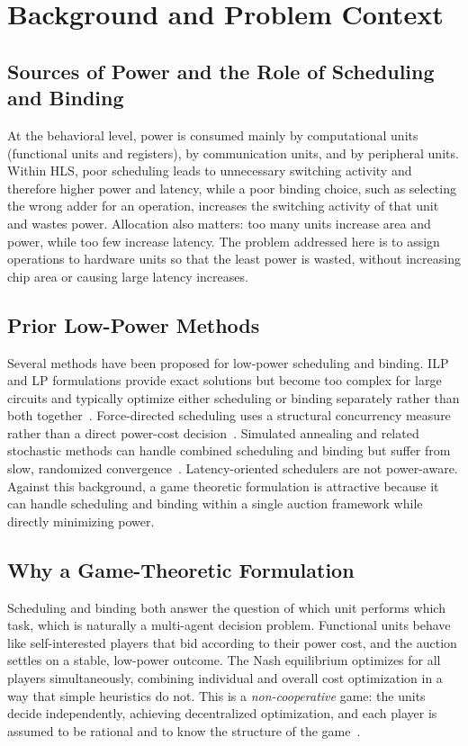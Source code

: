 \documentclass[conference]{IEEEtran}
\begin{document}
\section{Background and Problem Context}

\subsection{Sources of Power and the Role of Scheduling and Binding}
At the behavioral level, power is consumed mainly by computational
units (functional units and registers), by communication units, and by
peripheral units. Within HLS, poor scheduling leads to unnecessary
switching activity and therefore higher power and latency, while a poor
binding choice, such as selecting the wrong adder for an operation,
increases the switching activity of that unit and wastes power.
Allocation also matters: too many units increase area and power, while
too few increase latency. The problem addressed here is to assign
operations to hardware units so that the least power is wasted, without
increasing chip area or causing large latency increases.

\subsection{Prior Low-Power Methods}
Several methods have been proposed for low-power scheduling and
binding. ILP and LP formulations provide exact solutions but become too
complex for large circuits and typically optimize either scheduling or
binding separately rather than both together~\cite{shiue2000}.
Force-directed scheduling uses a structural concurrency measure rather
than a direct power-cost decision~\cite{paulin1989}. Simulated
annealing and related stochastic methods can handle combined scheduling
and binding but suffer from slow, randomized
convergence~\cite{dasgupta1995}. Latency-oriented schedulers are not
power-aware. Against this background, a game theoretic formulation is
attractive because it can handle scheduling and binding within a single
auction framework while directly minimizing power.

\subsection{Why a Game-Theoretic Formulation}
Scheduling and binding both answer the question of which unit performs
which task, which is naturally a multi-agent decision problem.
Functional units behave like self-interested players that bid according
to their power cost, and the auction settles on a stable, low-power
outcome. The Nash equilibrium optimizes for all players simultaneously,
combining individual and overall cost optimization in a way that simple
heuristics do not. This is a \emph{non-cooperative} game: the units
decide independently, achieving decentralized optimization, and each
player is assumed to be rational and to know the structure of the
game~\cite{nash1951}.
\end{document}
